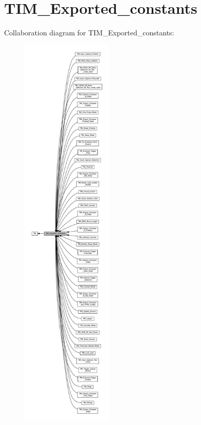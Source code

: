\hypertarget{group___t_i_m___exported__constants}{}\section{T\+I\+M\+\_\+\+Exported\+\_\+constants}
\label{group___t_i_m___exported__constants}
Collaboration diagram for T\+I\+M\+\_\+\+Exported\+\_\+constants\+:
\nopagebreak
\begin{figure}[H]
\begin{center}
\leavevmode
\includegraphics[height=550pt]{group___t_i_m___exported__constants}
\end{center}
\end{figure}
